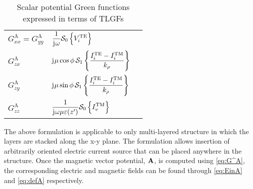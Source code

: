 \documentclass[12pt]{article}
\begin{document}
\begin{table}[!ht]
  \begin{center}
    \begin{tabular}{| C{2cm} | C{5cm} |  @{}m{0pt}@{}}
      \hline
      $G^\mathrm{A}_{xx} = G^\mathrm{A}_{yy}$ & $ \displaystyle \frac{1}{\mathrm{j}\mkern1mu \omega}\mathcal{S}_0 \left \{ V_i^{\mathrm{TE}} \right \} $ &\\ [3.5ex]
      $G^\mathrm{A}_{zx}$ & $ \displaystyle \mathrm{j}\mkern1mu \mu  \cos \phi \, \mathcal{S}_1 \left \{  \frac {I_i^{\mathrm{TE}} - I_i^{\mathrm{TM}}}{k_{\rho}}  \right \} $ &\\ [4.5ex]
      $G^\mathrm{A}_{zy}$ & $ \displaystyle \mathrm{j}\mkern1mu \mu  \sin \phi \, \mathcal{S}_1 \left \{  \frac {I_i^{\mathrm{TE}} - I_i^{\mathrm{TM}}}{k_{\rho}}  \right \} $ &\\ [3.5ex]
      $G^\mathrm{A}_{zz}$ & $ \displaystyle \frac{1}{\mathrm{j}\mkern1mu \omega \mu \varepsilon(z')} \mathcal{S}_0 \left \{ I_v^{\mathrm{TM}} \right \} $ &\\ [3.5ex]
      \hline \hline
    \end{tabular}
  \end{center}
  \caption{Scalar potential Green functions expressed in terms of TLGFs \cite{Michalski_2015}}
  \label{tab:G_scalar_list}
\end{table}
%

The above formulation is applicable to only multi-layered structure in which the layers are stacked along the x-y plane. The formulation allows insertion of arbitrarily oriented electric current source that can be placed anywhere in the structure. Once the magnetic vector potential, $\mathbf{A}$, is computed using \eqref{eq:G^A}, the corresponding electric and magnetic fields can be found through \eqref{eq:EinA} and \eqref{eq:defA} respectively.
\end{document}

